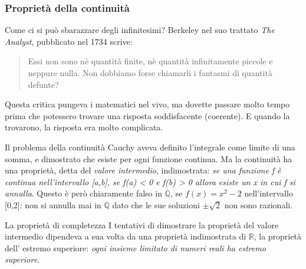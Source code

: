 \begin{frame}[label=Proprietà della continuità]
  \frametitle{Proprietà della continuità}
  \begin{block}{Come ci si può sbarazzare degli infinitesimi?}    
    Berkeley nel suo trattato \textit{The Analyst}, pubblicato nel 1734 scrive:
    \begin{quotation}
      Essi non sono nè quantità finite, nè quantità infinitamente piccole e neppure nulla. Non dobbiamo forse
      chiamarli i fantasmi di quantità defunte?
    \end{quotation}
    Questa critica pungeva i matematici nel vivo, ma dovette passare molto tempo prima che potessero trovare
    una risposta soddisfacente (coerente). E quando la trovarono, la risposta era molto complicata.
        \end{block}    
  \begin{block}{Il problema della continuità}
          Cauchy aveva definito l'integrale come limite di una somma, e dimostrato che esiste per ogni funzione continua.
          Ma la continuità ha una proprietà, detta del \textit{valore intermedio}, indimostrata: 
          \textit{se una funzione f è continua nell'intervallo [a,b],
          se f(a) < 0 e f(b) > 0 allora esiste un x in cui f si annulla}.
          Questo è però chiaramente falso in $\mathbb{Q}$, se $f(x) = x^2 -2$ nell'intervallo [0,2]: non si annulla mai in  
          $\mathbb{Q}$ dato che le sue soluzioni $\pm\sqrt{2}$ non sono razionali.
  \end{block}
  \begin{block}{La proprietà di completezza}
          I tentativi di dimostrare la proprietà del valore intermedio dipendeva a sua volta da una proprietà indimostrata di $\mathbb{R}$,
          la proprietà dell' estremo superiore: \textit{ogni insieme limitato di numeri reali ha estremo superiore}.
  \end{block}
\end{frame}

